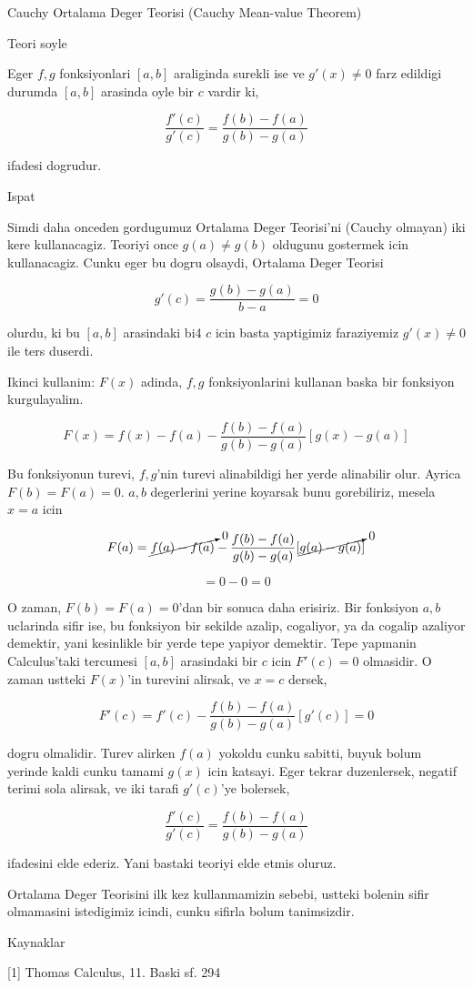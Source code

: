 \documentclass[12pt,fleqn]{article}
\begin{document}
Cauchy Ortalama Deger Teorisi (Cauchy Mean-value Theorem)

Teori soyle

Eger $f,g$ fonksiyonlari $[a,b]$ araliginda surekli ise ve $g'(x) \ne 0$
farz edildigi durumda $[a,b]$ arasinda oyle bir $c$ vardir ki,

\[ \frac{f'(c)}{g'(c)} = \frac{f(b)-f(a)}{g(b)-g(a)} \]

ifadesi dogrudur. 

Ispat

Simdi daha onceden gordugumuz Ortalama Deger Teorisi'ni (Cauchy olmayan)
iki kere kullanacagiz. Teoriyi once $g(a) \ne g(b)$ oldugunu gostermek icin
kullanacagiz. Cunku eger bu dogru olsaydi, Ortalama Deger Teorisi 

\[ g'(c) = \frac{g(b) - g(a)}{b-a} = 0\]

olurdu, ki bu $[a,b]$ arasindaki bi4 $c$ icin basta yaptigimiz faraziyemiz
$g'(x) \ne 0$ ile ters duserdi. 

Ikinci kullanim: $F(x)$ adinda, $f,g$ fonksiyonlarini kullanan baska bir
fonksiyon kurgulayalim.

\[ F(x) = f(x) - f(a) - \frac{f(b)-f(a) }{g(b)-g(a)}[g(x)-g(a)] \]

Bu fonksiyonun turevi, $f,g$'nin turevi alinabildigi her yerde alinabilir
olur. Ayrica $F(b) = F(a) = 0$. $a,b$ degerlerini yerine koyarsak bunu
gorebiliriz, mesela $x=a$ icin

\[ F(a) = \cancelto{0}{f(a) - f(a)} -
\frac{f(b)-f(a) }{g(b)-g(a)}
[\cancelto{0}{g(a)-g(a)}] 
\]

\[  = 0 - 0 = 0 \]

O zaman, $F(b) = F(a) = 0$'dan bir sonuca daha erisiriz. Bir fonksiyon
$a,b$ uclarinda sifir ise, bu fonksiyon bir sekilde azalip, cogaliyor, ya
da cogalip azaliyor demektir, yani kesinlikle bir yerde tepe yapiyor
demektir. Tepe yapmanin Calculus'taki tercumesi $[a,b]$ arasindaki bir $c$
icin $F'(c)=0$ olmasidir. O zaman ustteki $F(x)$'in turevini alirsak, ve
$x=c$ dersek, 

\[ F'(c) = f'(c) - \frac{f(b)-f(a)}{g(b)-g(a)}[g'(c)] = 0\]

dogru olmalidir. Turev alirken $f(a)$ yokoldu cunku sabitti, buyuk bolum
yerinde kaldi cunku tamami $g(x)$ icin katsayi. Eger tekrar duzenlersek,
negatif terimi sola alirsak, ve iki tarafi $g'(c)$'ye bolersek,

\[ \frac{f'(c)}{g'(c)} = \frac{f(b)-f(a)}{g(b)-g(a)} \]

ifadesini elde ederiz. Yani bastaki teoriyi elde etmis oluruz. 

Ortalama Deger Teorisini ilk kez kullanmamizin sebebi, ustteki bolenin sifir
olmamasini istedigimiz icindi, cunku sifirla bolum tanimsizdir. 



Kaynaklar 

[1] Thomas Calculus, 11. Baski sf. 294
\end{document}
